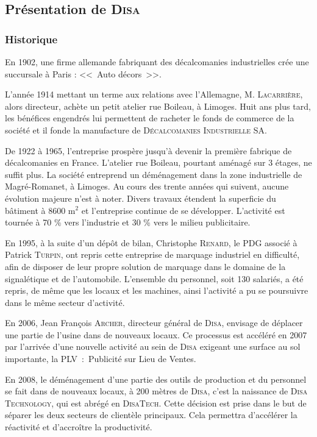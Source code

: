 \subsection{Présentation de \textsc{Disa}}

\subsubsection{Historique}

En 1902, une firme allemande fabriquant des décalcomanies industrielles crée une succursale à
Paris : <<~Auto décors~>>.

L’année 1914 mettant un terme aux relations avec l’Allemagne, M. \textsc{Lacarrière}, alors directeur, achète un petit atelier rue Boileau, à Limoges.
Huit ans plus tard, les bénéfices engendrés lui permettent de racheter le fonds de commerce de la société et il fonde la manufacture de \textsc{Décalcomanies Industrielle SA}.

De 1922 à 1965, l’entreprise prospère jusqu’à devenir la première fabrique de décalcomanies en France.
L’atelier rue Boileau, pourtant aménagé sur 3 étages, ne suffit plus.
La société entreprend un déménagement dans la zone industrielle de Magré-Romanet, à Limoges.
Au cours des trente années qui suivent, aucune évolution majeure n’est à noter.
Divers travaux étendent la superficie du bâtiment à 8600 m$^2$ et l’entreprise continue de se développer.
L’activité est tournée à 70 \% vers l’industrie et 30 \% vers le milieu publicitaire.

En 1995, à la suite d’un dépôt de bilan, Christophe \textsc{Renard}, le PDG associé à Patrick \textsc{Turpin}, ont repris cette entreprise de marquage industriel en difficulté, afin de disposer de leur propre solution de marquage dans le domaine de la signalétique et de l'automobile.
L'ensemble du personnel, soit 130 salariés, a été repris, de même que les locaux et les machines, ainsi l'activité a pu se poursuivre dans le même secteur d'activité.

En 2006, Jean François \textsc{Archer}, directeur général de \textsc{Disa}, envisage de déplacer une partie de l’usine dans de nouveaux locaux.
Ce processus est accéléré en 2007 par l’arrivée d’une nouvelle activité au sein de \textsc{Disa} exigeant une surface au sol importante, la PLV~:~Publicité sur Lieu de Ventes.

En 2008, le déménagement d’une partie des outils de production et du personnel se fait dans de nouveaux locaux, à 200 mètres de \textsc{Disa}, c'est la naissance de \textsc{Disa Technology}, qui est abrégé en \textsc{DisaTech}.
Cette décision est prise dans le but de séparer les deux secteurs de clientèle principaux.
Cela permettra d’accélérer la réactivité et d'accroître la productivité.

